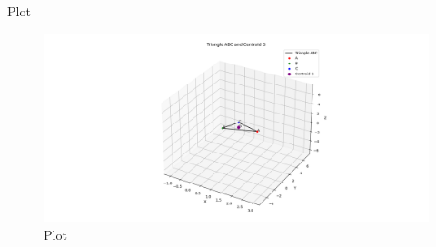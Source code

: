 \documentclass{beamer}
\begin{document}
\begin{frame}{Plot}

\begin{figure}[H]
    \centering
    \includegraphics[width=01\textwidth]{figs/fig1.png}
    \caption{Plot}
    \label{Plot}
\end{figure}

\end{frame}
\end{document}
